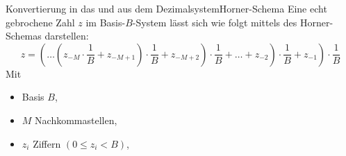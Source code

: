 \documentclass[xelatex,aspectratio=169]{beamer}
\begin{document}
\begin{frame}[t]{Konvertierung in das und aus dem Dezimalsystem}{Horner-Schema}
  Eine echt gebrochene Zahl $z$ im Basis-$B$-System lässt sich wie folgt mittels des Horner-Schemas darstellen:
  \[ z = \left( \left. \left. \ldots \left( z_{-M} \cdot \frac{1}{B} + z_{-M+1} \right) \cdot \frac{1}{B} + z_{-M+2} \right) \cdot \frac{1}{B} + \ldots + z_{-2} \right) \cdot \frac{1}{B} + z_{-1} \right) \cdot \frac{1}{B} \]
  Mit
  \begin{itemize}
    \item Basis $B$,
    \item $M$ Nachkommastellen,
    \item $z_i$ Ziffern $\left(0 \leq z_i < B\right)$,
  \end{itemize}

\end{frame}
\end{document}
